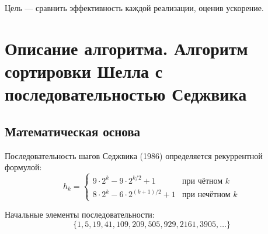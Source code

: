 \documentclass[a4paper,14pt]{extarticle}
\begin{document}
Цель — сравнить эффективность каждой реализации, оценив ускорение.

\newpage

\section*{Описание алгоритма. Алгоритм сортировки Шелла с последовательностью Седжвика}

\subsection*{Математическая основа}
Последовательность шагов Седжвика (1986) определяется рекуррентной формулой:
\begin{equation*}
h_k = \begin{cases}
9 \cdot 2^k - 9 \cdot 2^{k/2} + 1 & \text{при чётном } k \\
8 \cdot 2^k - 6 \cdot 2^{(k+1)/2} + 1 & \text{при нечётном } k
\end{cases}
\end{equation*}

Начальные элементы последовательности:
\begin{equation*}
\{1, 5, 19, 41, 109, 209, 505, 929, 2161, 3905, \ldots\}
\end{equation*}
\end{document}
